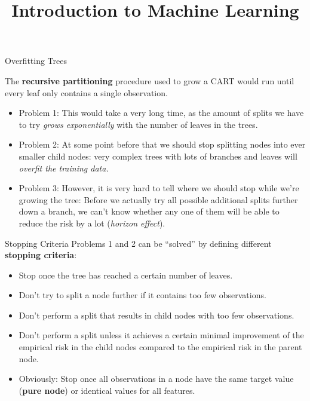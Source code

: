 \documentclass[11pt,compress,t,notes=noshow, xcolor=table]{beamer}
\title{Introduction to Machine Learning}
\institute{\href{https://compstat-lmu.github.io/lecture_i2ml/}{compstat-lmu.github.io/lecture\_i2ml}}
\date{}
\begin{document}














\sloppy

\begin{frame}{Overfitting Trees}

The \textbf{recursive partitioning} procedure used to grow a CART would run until every leaf only contains a single observation. 
\begin{itemize}
\item Problem 1: This would take a very long time, as the amount of splits we have to try \emph{grows exponentially} with the number of leaves in the trees.
\item Problem 2: At some point before that we should stop splitting nodes into ever smaller child nodes: very complex trees with lots of branches and leaves will \emph{overfit the training data.}
\item Problem 3: However, it is very hard to tell where we should stop while we're growing the tree: Before we actually try all possible additional splits further down a branch, we can't know whether any one of them will be able to reduce the risk by a lot (\emph{horizon effect}).
\end{itemize}
\end{frame}

\begin{vbframe}{Stopping Criteria}
Problems 1 and 2 can be \enquote{solved} by defining different \textbf{stopping criteria}:
  \begin{itemize}
    \item Stop once the tree has reached a certain number of leaves.
    \item Don't try to split a node further if it contains too few observations.
    \item Don't perform a split that results in child nodes with too few observations.
    \item Don't perform a split unless it achieves a certain minimal improvement of the empirical risk in the child nodes compared to the empirical risk in the parent node.
    \item Obviously: Stop once all observations in a node have the same target value (\textbf{pure node}) or identical values for all features. 
  \end{itemize}
\end{vbframe}
\end{document}
